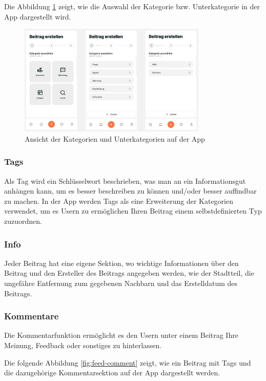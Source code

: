 Die Abbildung \ref{fig:categories} zeigt, wie die Auswahl der Kategorie bzw. Unterkategorie in der App dargestellt wird.

\begin{figure}[H]
  \centering
  \includegraphics[width=0.8\textwidth]{pics/categories.JPG}
  \caption{Ansicht der Kategorien und Unterkategorien auf der App}
  \label{fig:categories}
\end{figure}


\subsubsection{Tags}
Als Tag wird ein Schlüsselwort beschrieben, was man an ein Informationsgut anhängen kann, um es besser beschreiben zu können und/oder besser auffindbar zu machen. In der App werden Tags als eine Erweiterung der Kategorien verwendet, um es Usern zu ermöglichen Ihren Beitrag einem selbstdefinierten Typ zuzuordnen.

\subsubsection{Info}
Jeder Beitrag hat eine eigene Sektion, wo wichtige Informationen über den Beitrag und den Ersteller des Beitrags angegeben werden, wie der Stadtteil, die ungefähre Entfernung zum gegebenen Nachbarn und das Erstelldatum des Beitrags.

\subsubsection{Kommentare}
Die Kommentarfunktion ermöglicht es den Usern unter einem Beitrag Ihre Meinung, Feedback oder sonstiges zu hinterlassen.

Die folgende Abbildung \ref{fig:feed-comment} zeigt, wie ein Beitrag mit Tags und die dazugehörige Kommentarsektion auf der App dargestellt werden.

